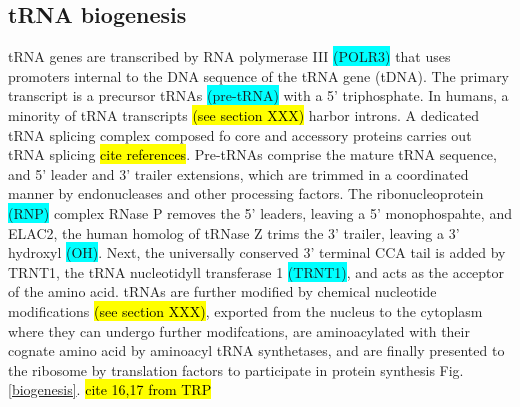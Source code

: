\documentclass[12pt]{rockefeller}
\newcommand{\cyan}[1]{\colorbox{cyan}{#1}}
\begin{document}
\subsection{tRNA biogenesis}
tRNA genes are transcribed by RNA polymerase III \cyan{(POLR3)} that uses promoters internal to the DNA sequence of the tRNA gene (tDNA). The primary transcript is a precursor tRNAs \cyan{(pre-tRNA)} with a 5' triphosphate. In humans, a minority of tRNA transcripts \hl{(see section XXX)} harbor introns. A dedicated tRNA splicing complex composed fo core and accessory proteins carries out tRNA splicing \hl{cite references}. Pre-tRNAs comprise the mature tRNA sequence, and 5' leader and 3' trailer extensions, which are trimmed in a coordinated manner by endonucleases and other processing factors. The ribonucleoprotein \cyan{(RNP)} complex RNase P removes the 5' leaders, leaving a 5' monophospahte, and ELAC2, the human homolog of tRNase Z trims the 3' trailer, leaving a 3' hydroxyl \cyan{(OH)}. Next, the universally conserved 3' terminal CCA tail is added by TRNT1, the tRNA nucleotidyll transferase 1 \cyan{(TRNT1)}, and acts as the acceptor of the amino acid. tRNAs are further modified by chemical nucleotide modifications \hl{(see section XXX)}, exported from the nucleus to the cytoplasm where they can undergo further modifcations, are aminoacylated with their cognate amino acid by aminoacyl tRNA synthetases, and are finally presented to the ribosome by translation factors to participate in protein synthesis Fig. \ref{biogenesis}. \hl{cite 16,17 from TRP}
\end{document}
